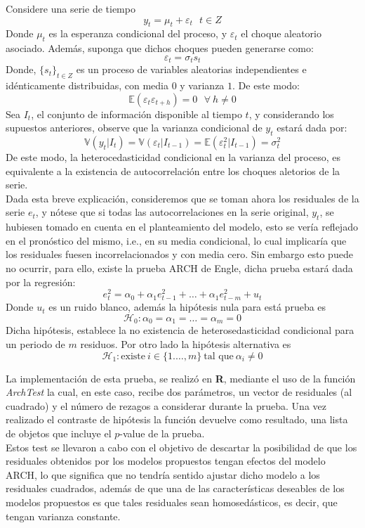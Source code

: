 \documentclass{article}
\theoremstyle{remark}
\begin{document}
Considere una serie de tiempo 
\[y_t = \mu_t + \varepsilon_t   \ \ \  t\in Z\]
Donde \(\mu_t\) es la esperanza condicional del proceso, y \(\varepsilon_t\) el choque aleatorio asociado. Además, suponga que dichos choques pueden generarse como: %
\[\varepsilon_t = \sigma_t s_t\]
Donde, \(\{s_t\}_{t \in Z}\) es un proceso de variables aleatorias independientes e idénticamente distribuidas, con media \(0\)
y varianza \(1\). De este modo: 
\[\mathbb{E}\left(\varepsilon_{t}\varepsilon_{t+h}\right) = 0 \ \ \ \forall  \ h \neq 0\]
Sea \(I_t\), el conjunto de información disponible al tiempo \(t\), y considerando los supuestos anteriores, observe que la varianza condicional de \(y_t\) estará dada por: 
\[
   \mathbb{V}(y_t|I_t) = \mathbb{V}(\varepsilon_t|I_{t-1}) = \mathbb{E}(\varepsilon_t^{2}|I_{t-1}) = \sigma^2_t
\]
De este modo, la heterocedasticidad condicional en la varianza del proceso, es equivalente a la existencia de autocorrelación 
entre los choques aletorios de la serie.\\  

Dada esta breve explicación, consideremos que se toman ahora los residuales de la serie \(e_t\), y nótese que si todas las autocorrelaciones en la serie original, \(y_t\), 
se hubiesen tomado en cuenta en el planteamiento del modelo, esto se vería reflejado en el pronóstico del mismo, i.e., en su media condicional, lo cual implicaría que los residuales fuesen incorrelacionados y con media cero. Sin embargo esto puede no ocurrir, para ello, existe la prueba ARCH de Engle, dicha prueba estará dada por la regresión: 
\[e_t^2 = \alpha_0 + \alpha_1e_{t-1}^2+ \hdots +\alpha_1e_{t-m}^2 + u_t \]
Donde \(u_t\) es un ruido blanco, además la hipótesis nula para está prueba es
\[
\mathscr{H}_0: \alpha_0=\alpha_1=\hdots=\alpha_m=0
\]
Dicha hipótesis, establece la no existencia de heterosedasticidad condicional para un periodo de \(m\) residuos. Por otro lado la hipótesis alternativa es 
\[
\mathscr{H}_1: \text{existe}\ i\in\{1.\hdots,m\} \ \text{tal que} \ \alpha_i \neq 0 
\]

 La implementación de esta prueba, se realizó en \textbf{R}, mediante el uso de la función \textit{ArchTest} la cual, en este caso, recibe dos parámetros, un vector de residuales (al cuadrado) y el número de rezagos a considerar durante la prueba. Una vez realizado el contraste de hipótesis la función devuelve como resultado, una lista de objetos que incluye el \(p\)-value de la prueba. \\

Estos test se llevaron a cabo con el objetivo de descartar la posibilidad de que los residuales obtenidos por los modelos propuestos tengan efectos del modelo ARCH, lo que significa que no tendría sentido ajustar dicho modelo a los residuales cuadrados, además de que una de las características deseables de los modelos propuestos es que tales residuales sean homosedásticos, es decir, que tengan  varianza constante.\\
\end{document}
